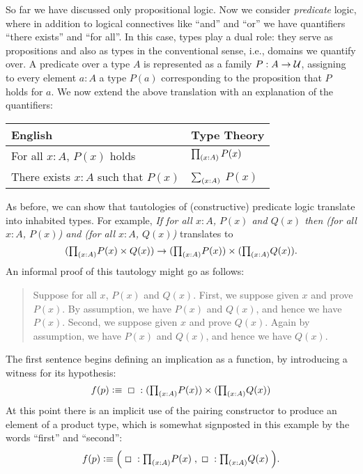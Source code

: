 So far we have discussed only propositional logic.
%
%
%
Now we consider \emph{predicate} logic, where in addition to logical connectives like ``and'' and ``or'' we have quantifiers ``there exists'' and ``for all''.
In this case, types play a dual role: they serve as propositions and also as types in the conventional sense, i.e., domains we quantify over.
A predicate over a type $A$ is represented as a family $P : A \to \mathcal{U}$, assigning to every element $a : A$ a type $P(a)$ corresponding to the proposition that $P$ holds for $a$. We now extend the above translation with an explanation of the quantifiers:
\begin{center}
  \medskip
  \begin{tabular}{ll}
    \toprule
    English & Type Theory\\
    \midrule
    For all $x:A$, $P(x)$ holds & $\prd{x:A} P(x)$ \\
    There exists $x:A$ such that $P(x)$ & $\sm{x:A}$ $P(x)$ \\
    \bottomrule
  \end{tabular}
  \medskip
\end{center}
As before, we can show that tautologies of (constructive) predicate logic translate into inhabited types.
For example, \emph{If for all $x:A$, $P(x)$ and $Q(x)$ then (for all $x:A$, $P(x)$) and (for all $x:A$, $Q(x)$)} translates to
\[ (\tprd{x:A} P(x) \times Q(x)) \to (\tprd{x:A} P(x)) \times (\tprd{x:A} Q(x)). \]
An informal proof of this tautology might go as follows:
\begin{quote}
  Suppose for all $x$, $P(x)$ and $Q(x)$.
  First, we suppose given $x$ and prove $P(x)$.
  By assumption, we have $P(x)$ and $Q(x)$, and hence we have $P(x)$.
  Second, we suppose given $x$ and prove $Q(x)$.
  Again by assumption, we have $P(x)$ and $Q(x)$, and hence we have $Q(x)$.
\end{quote}
The first sentence begins defining an implication as a function, by introducing a witness for its hypothesis:
\[ f(p) \defeq \;\Box\; : (\tprd{x:A} P(x)) \times (\tprd{x:A} Q(x)) \]
At this point there is an implicit use of the pairing constructor to produce an element of a product type, which is somewhat signposted in this example by the words ``first'' and ``second'':
\[ f(p) \defeq \Big( \;\Box\; : \tprd{x:A} P(x) \;,\; \Box\; : \tprd{x:A}Q(x) \;\Big). \]

